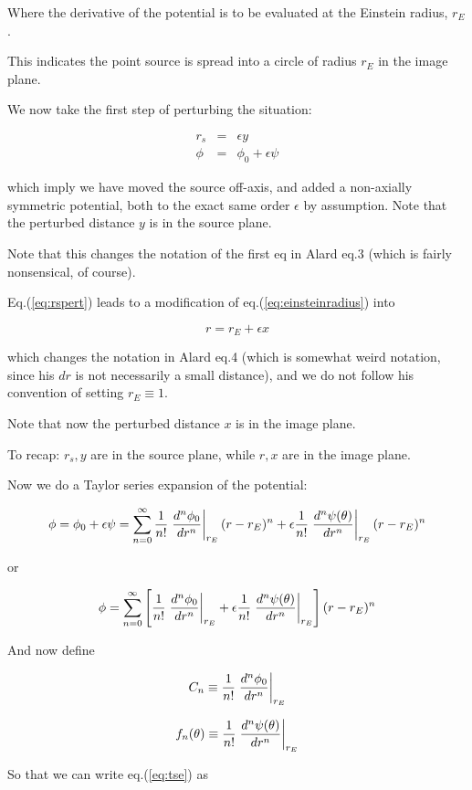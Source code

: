\documentclass{article}
\def\be{\begin{equation}}
\def\ee{\end{equation}}
\def\bea{\begin{eqnarray}}
\def\eea{\end{eqnarray}}
\newcommand{\eps}{\epsilon}
\def \eps {\epsilon}
\begin{document}
Where the derivative of the potential is to be evaluated at the Einstein radius, $ {r_E}$.

This indicates the point source is spread into a circle of radius $ {r_E}$ in the image plane.

We now take the first step of perturbing the situation:

\bea
\label{eq:rspert}
r_s & = & \eps y \\
\phi & = & \phi_0 + \eps \psi
\eea

which imply we have moved the source off-axis, and added a non-axially
symmetric potential, both to the exact same order $\eps$ by
assumption.  Note that the perturbed distance $y$ is in the source plane.

Note that this changes the notation of the first eq in Alard eq.3
(which is fairly nonsensical, of course).

Eq.(\ref{eq:rspert}) leads to a modification of eq.(\ref{eq:einsteinradius}) into

\be
\label{eq:rpert}
r = r_E + \eps x
\ee

which changes the notation in Alard eq.4 (which is somewhat weird
notation, since his $dr$ is not necessarily a small distance), and we
do not follow his convention of setting $r_E \equiv 1$.
  
Note that now the perturbed distance $x$ is in the image plane.

To recap: $r_s, y$ are in the source plane, while $r, x$ are in the image plane.

Now we do a Taylor series expansion of the potential:

\be
\phi = \phi_0 + \eps \psi = \sum_{n=0}^\infty {1 \over n!} \left. {d^n \phi_0 \over dr^n }\right|_{r_E} (r-r_E)^n + \eps {1 \over n!} \left. {d^n \psi(\theta) \over dr^n }\right|_{r_E} (r-r_E)^n 
\ee

or

\be
\label{eq:tse}
\phi  = \sum_{n=0}^\infty \left[ {1 \over n!} \left. {d^n \phi_0 \over dr^n }\right|_{r_E} + \eps {1 \over n!} \left. {d^n \psi(\theta) \over dr^n }\right|_{r_E} \right] (r-r_E)^n 
\ee

And now define

\be
C_n \equiv {1 \over n!} \left. {d^n \phi_0 \over dr^n }\right|_{r_E} 
\ee

\be
f_n(\theta) \equiv  {1 \over n!} \left. {d^n \psi(\theta) \over dr^n }\right|_{r_E}
\ee

So that we can write  eq.(\ref{eq:tse}) as
\end{document}
